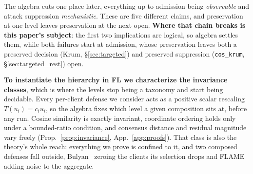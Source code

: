 \documentclass{article}
\begin{document}
\noindent The algebra cuts one place later, everything up to admission being \emph{observable} and attack suppression \emph{mechanistic}. These are five different claims, and preservation at one level leaves preservation at the next open. \textbf{Where that chain breaks is this paper's subject}: the first two implications are logical, so algebra settles them, while both failures start at admission, whose preservation leaves both a preserved decision (Krum, §\ref{sec:targeted}) and preserved suppression (\texttt{cos\_krum}, §\ref{sec:targeted_rest}) open.

\noindent \textbf{To instantiate the hierarchy in FL we characterize the invariance classes}, which is where the levels stop being a taxonomy and start being decidable. Every per-client defense we consider acts as a positive scalar rescaling $T(u_i) = c_i u_i$, so the algebra fixes which level a given composition sits at, before any run. Cosine similarity is exactly invariant, coordinate ordering holds only under a bounded-ratio condition, and consensus distance and residual magnitude vary freely (Prop.~\ref{prop:invariance}, App.~\ref{app:proofs}). That class is also the theory's whole reach: everything we prove is confined to it, and two composed defenses fall outside, Bulyan~\citep{elmhamdi2018hidden} zeroing the clients its selection drops and FLAME~\citep{nguyen2022flame} adding noise to the aggregate.
\end{document}
